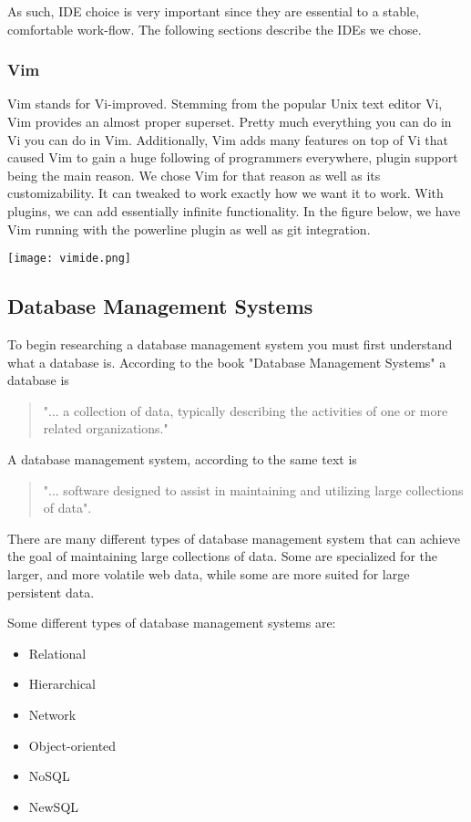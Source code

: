 \documentclass[letterpaper, 12pt]{article}
\renewcommand{\includegraphics}[2][]{\fbox{}}
\begin{document}
As such, IDE choice is very important since they are essential to a stable, comfortable work-flow. The following sections describe the IDEs we chose.

\subsubsection{Vim}

Vim stands for Vi-improved. Stemming from the popular Unix text editor Vi, Vim provides an almost proper superset. Pretty much everything you can do in Vi you can do in Vim. Additionally, Vim adds many features on top of Vi that caused Vim to gain a huge following of programmers everywhere, plugin support being the main reason. We chose Vim for that reason as well as its customizability. It can tweaked to work exactly how we want it to work. With plugins, we can add essentially infinite functionality. In the figure below, we have Vim running with the powerline plugin as well as git integration. 

\texttt{[image: vimide.png]}

\subsection{Database Management Systems}
To begin researching a database management system you must first understand what a 
database is. According to the book "Database Management Systems" a database is

\begin{quote}
"... a collection of data, typically describing the activities of one or more related
organizations."\cite{ramakrishnan2000database}
\end{quote}

A database management system, according to the same text is

\begin{quote}
"... software designed to assist in maintaining and utilizing large collections of data".
\cite{ramakrishnan2000database}
\end{quote}

There are many different types of database management system that can achieve the
goal of maintaining large collections of data. Some are specialized for the larger, and 
more volatile web data, while some are more suited for large persistent data.  
\par\vspace{\baselineskip}
Some different types of database management systems are:
\begin{itemize}
\item Relational
\item Hierarchical
\item Network
\item Object-oriented
\item NoSQL
\item NewSQL
\end{itemize}
\end{document}
